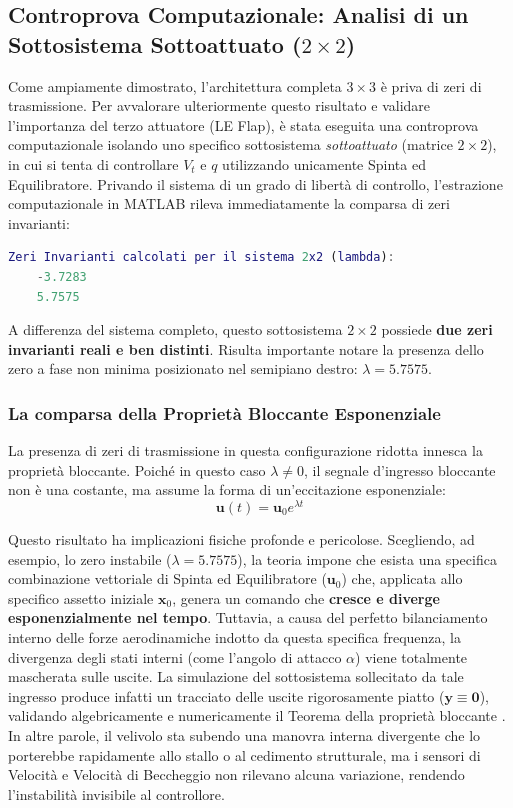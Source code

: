 \subsection{Controprova Computazionale: Analisi di un Sottosistema Sottoattuato ($2 \times 2$)}

Come ampiamente dimostrato, l'architettura completa $3 \times 3$ è priva di zeri di trasmissione. Per avvalorare ulteriormente questo risultato e validare l'importanza del terzo attuatore (LE Flap), è stata eseguita una controprova computazionale isolando uno specifico sottosistema \textit{sottoattuato} (matrice $2 \times 2$), in cui si tenta di controllare $V_t$ e $q$ utilizzando unicamente Spinta ed Equilibratore. Privando il sistema di un grado di libertà di controllo, l'estrazione computazionale in MATLAB rileva immediatamente la comparsa di zeri invarianti:

\begin{lstlisting}[language=MATLAB]
	Zeri Invarianti calcolati per il sistema 2x2 (lambda):
	-3.7283
	5.7575
\end{lstlisting}

A differenza del sistema completo, questo sottosistema $2 \times 2$ possiede \textbf{due zeri invarianti reali e ben distinti}. Risulta importante notare la presenza dello zero a fase non minima posizionato nel semipiano destro: $\lambda = 5.7575$.

\subsubsection{La comparsa della Proprietà Bloccante Esponenziale}
La presenza di zeri di trasmissione in questa configurazione ridotta innesca la proprietà bloccante. Poiché in questo caso $\lambda \neq 0$, il segnale d'ingresso bloccante non è una costante, ma assume la forma di un'eccitazione esponenziale:
\begin{equation}
	\mathbf{u}(t) = \mathbf{u}_0 e^{\lambda t}
\end{equation}

Questo risultato ha implicazioni fisiche profonde e pericolose. Scegliendo, ad esempio, lo zero instabile ($\lambda = 5.7575$), la teoria impone che esista una specifica combinazione vettoriale di Spinta ed Equilibratore ($\mathbf{u}_0$) che, applicata allo specifico assetto iniziale $\mathbf{x}_0$, genera un comando che \textbf{cresce e diverge esponenzialmente nel tempo}. Tuttavia, a causa del perfetto bilanciamento interno delle forze aerodinamiche indotto da questa specifica frequenza, la divergenza degli stati interni (come l'angolo di attacco $\alpha$) viene totalmente mascherata sulle uscite. La simulazione del sottosistema sollecitato da tale ingresso produce infatti un tracciato delle uscite rigorosamente piatto ($\mathbf{y} \equiv \mathbf{0}$), validando algebricamente e numericamente il Teorema della proprietà bloccante \cite{ferramosca_cal_multivariabili_misc}. 
In altre parole, il velivolo sta subendo una manovra interna divergente che lo porterebbe rapidamente allo stallo o al cedimento strutturale, ma i sensori di Velocità e Velocità di Beccheggio non rilevano alcuna variazione, rendendo l'instabilità invisibile al controllore.

